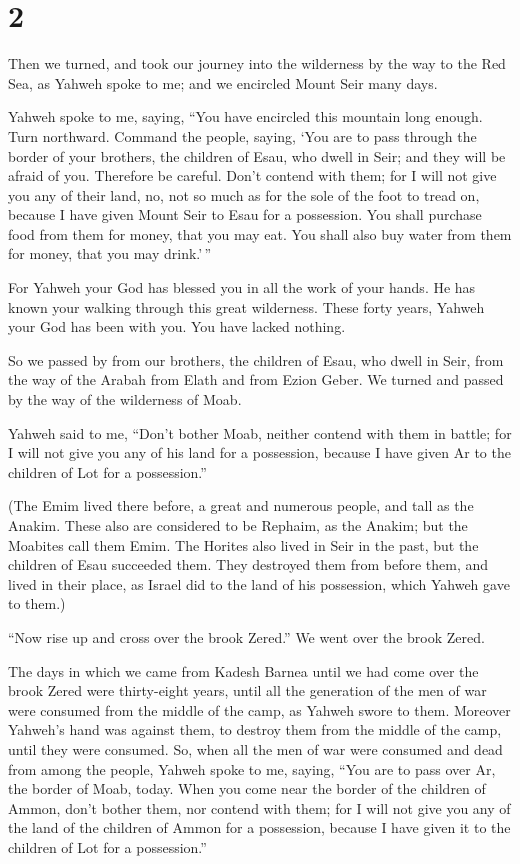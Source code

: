 \hypertarget{section-1}{%
\section{2}\label{section-1}}

 Then we turned, and took our journey into the wilderness by
the way to the Red Sea, as Yahweh spoke to me; and we encircled Mount
Seir many days.

 Yahweh spoke to me, saying,  ``You have
encircled this mountain long enough. Turn northward. 
Command the people, saying, `You are to pass through the border of your
brothers, the children of Esau, who dwell in Seir; and they will be
afraid of you. Therefore be careful.  Don't contend with
them; for I will not give you any of their land, no, not so much as for
the sole of the foot to tread on, because I have given Mount Seir to
Esau for a possession.  You shall purchase food from them
for money, that you may eat. You shall also buy water from them for
money, that you may drink.'\,''

 For Yahweh your God has blessed you in all the work of your
hands. He has known your walking through this great wilderness. These
forty years, Yahweh your God has been with you. You have lacked nothing.

 So we passed by from our brothers, the children of Esau,
who dwell in Seir, from the way of the Arabah from Elath and from Ezion
Geber. We turned and passed by the way of the wilderness of Moab.

 Yahweh said to me, ``Don't bother Moab, neither contend
with them in battle; for I will not give you any of his land for a
possession, because I have given Ar to the children of Lot for a
possession.''

 (The Emim lived there before, a great and numerous people,
and tall as the Anakim.  These also are considered to be
Rephaim, as the Anakim; but the Moabites call them Emim. 
The Horites also lived in Seir in the past, but the children of Esau
succeeded them. They destroyed them from before them, and lived in their
place, as Israel did to the land of his possession, which Yahweh gave to
them.)

 ``Now rise up and cross over the brook Zered.'' We went
over the brook Zered.

 The days in which we came from Kadesh Barnea until we had
come over the brook Zered were thirty-eight years, until all the
generation of the men of war were consumed from the middle of the camp,
as Yahweh swore to them.  Moreover Yahweh's hand was
against them, to destroy them from the middle of the camp, until they
were consumed.  So, when all the men of war were consumed
and dead from among the people,  Yahweh spoke to me,
saying,  ``You are to pass over Ar, the border of Moab,
today.  When you come near the border of the children of
Ammon, don't bother them, nor contend with them; for I will not give you
any of the land of the children of Ammon for a possession, because I
have given it to the children of Lot for a possession.''

